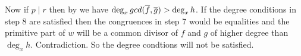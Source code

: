 \documentclass[a4paper, 11pt]{article}
\begin{document}
{				Now if $p\mid r$ then by  we have $\deg_xgcd(\overline{f},\overline{g})>\deg_x h$. If the degree conditions in step 8 are satisfied then the congruences in step 7 would be equalities and the primitive part of $w$ will be a common divisor of $f$ and $g$ of higher degree than $\deg_x h$. Contradiction. So the degree condtions will not be satisfied.
 }
\end{document}
